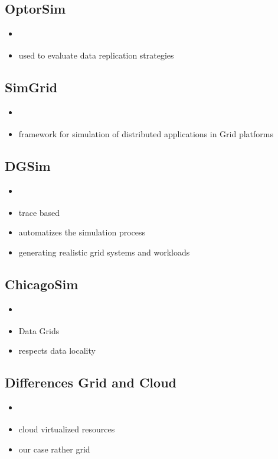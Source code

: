 \subsection{OptorSim}
\begin{itemize}
	\item \cite{optorsim}
	\item used to evaluate data replication strategies
\end{itemize}

\subsection{SimGrid}
\begin{itemize}
	\item \cite{simgrid}
	\item framework for simulation of distributed applications in Grid platforms
\end{itemize}

\subsection{DGSim}
\begin{itemize}
	\item \cite{dgsim}
	\item trace based
	\item automatizes the simulation process
	\item generating realistic grid systems and workloads
\end{itemize}

\subsection{ChicagoSim}
\begin{itemize}
	\item \cite{chicagosim}
	\item Data Grids
	\item respects data locality
\end{itemize}


\subsection{Differences Grid and Cloud}
\begin{itemize}
	\item \cite{compare_grid_cloud}
	\item cloud virtualized resources
	\item our case rather grid
\end{itemize}



